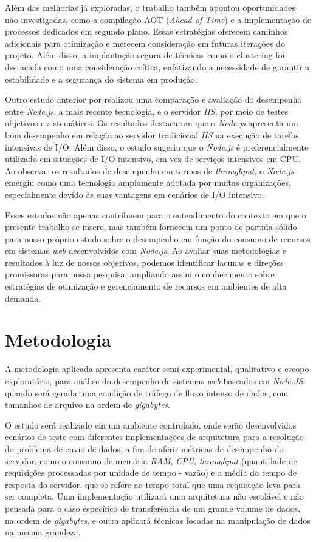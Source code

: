 \documentclass[12pt]{article}
\begin{document}
Além das melhorias já exploradas, o trabalho também apontou oportunidades não 
investigadas, como a compilação AOT (\textit{Ahead of Time}) e a implementação de processos dedicados em segundo 
plano. Essas estratégias oferecem caminhos adicionais para otimização e merecem consideração em futuras 
iterações do projeto. Além disso, a implantação segura de técnicas como o clustering foi destacada como uma 
consideração crítica, enfatizando a necessidade de garantir a estabilidade e a segurança do sistema em produção.

Outro estudo anterior por \cite{NODEJVERSUSIIS} realizou uma comparação e avaliação do desempenho entre \textit{Node.js}, a mais recente 
tecnologia, e o servidor \textit{IIS}, por meio de testes objetivos e sistemáticos. Os resultados 
destacaram que o \textit{Node.js} apresenta um bom desempenho em relação ao servidor tradicional \textit{IIS} na 
execução de tarefas intensivas de I/O. Além disso, o estudo sugeriu que o \textit{Node.js} é preferencialmente utilizado 
em situações de I/O intensivo, em vez de serviços intensivos em CPU. Ao observar os resultados de desempenho em 
termos de \textit{throughput}, o \textit{Node.js} emergiu como uma tecnologia amplamente adotada por muitas organizações, 
especialmente devido às suas vantagens em cenários de I/O intensivo.

Esses estudos não apenas contribuem para o entendimento do contexto em que o presente trabalho se insere, 
mas também fornecem um ponto de partida sólido para nosso próprio estudo sobre o desempenho em função 
do consumo de recursos em sistemas \textit{web} desenvolvidos com \textit{Node.js}. Ao avaliar suas metodologias e 
resultados à luz de nossos objetivos, podemos identificar lacunas e direções promissoras para nossa 
pesquisa, ampliando assim o conhecimento sobre estratégias de otimização e gerenciamento de recursos 
em ambientes de alta demanda.


\section{Metodologia}

A metodologia aplicada apresenta caráter semi-experimental, qualitativo
e escopo exploratório, para análise do desempenho de sistemas \textit{web} baseados em \textit{Node.JS} 
quando será gerada uma condição de tráfego de fluxo intenso de dados,
com tamanhos de arquivo na ordem de \textit{gigabytes}.

O estudo será realizado em um ambiente controlado, onde serão desenvolvidos cenários de teste com diferentes 
implementações de arquitetura para a resolução do problema de envio de dados, a fim de aferir métricas de desempenho do servidor, 
como o consumo de memória \textit{RAM}, \textit{CPU}, \textit{throughput} (quantidade de requisições processadas por unidade 
de tempo - vazão) e a média do tempo de resposta do servidor, que se refere ao tempo total que uma requisição leva
para ser completa. Uma implementação utilizará uma arquitetura não escalável e não 
pensada para o caso específico de transferência de um grande volume de dados, na ordem de \textit{gigabytes}, e outra aplicará técnicas focadas na 
manipulação de dados na mesma grandeza.
\end{document}
